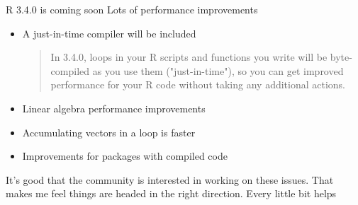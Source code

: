 \documentclass{beamer}
\begin{document}
\begin{frame}{R 3.4.0 is coming soon}
Lots of performance improvements
\begin{itemize}
\item A just-in-time compiler will be included
\begin{quote}
In 3.4.0, loops in your R scripts and functions you write will be byte-compiled as you use them ("just-in-time"), 
so you can get improved performance for your R code without taking any additional actions.
\end{quote}
\item Linear algebra performance improvements
\item Accumulating vectors in a loop is faster
\item Improvements for packages with compiled code
\end{itemize}
It's good that the community is interested in working on these issues. That makes me feel things are headed in
the right direction. Every little bit helps
\end{frame}
\end{document}
